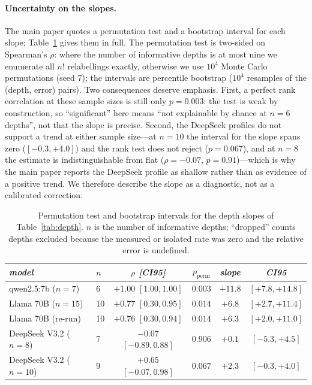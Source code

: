 \documentclass[sigconf,anonymous]{aamas}
\begin{document}
\paragraph{Uncertainty on the slopes.} The main paper quotes a permutation test and a
bootstrap interval for each slope; Table~\ref{tab:depth-perm} gives them in full. The
permutation test is two-sided on Spearman's $\rho$: where the number of informative
depths is at most nine we enumerate all $n!$ relabellings exactly, otherwise we use
$10^4$ Monte Carlo permutations (seed 7); the intervals are percentile bootstrap
($10^4$ resamples of the (depth, error) pairs). Two consequences deserve emphasis.
First, a perfect rank correlation at these sample sizes is still only
$p = 0.003$: the test is weak by construction, so ``significant'' here means ``not
explainable by chance at $n = 6$ depths'', not that the slope is precise. Second, the
DeepSeek profiles do not support a trend at either sample size---at $n = 10$ the
interval for the slope spans zero ($[-0.3, +4.0]$) and the rank test does not reject
($p = 0.067$), and at $n = 8$ the estimate is indistinguishable from flat
($\rho = -0.07$, $p = 0.91$)---which is why the main paper reports the DeepSeek profile
as shallow rather than as evidence of a positive trend. We therefore describe the
slope as a diagnostic, not as a calibrated correction.

\begin{table}[h]
\scriptsize
\centering
\caption{Permutation test and bootstrap intervals for the depth slopes of
Table~\ref{tab:depth}. $n$ is the number of informative depths; ``dropped'' counts
depths excluded because the measured or isolated rate was zero and the relative error
is undefined.}
\vspace{4pt}
\label{tab:depth-perm}
\setlength{\tabcolsep}{3pt}
\begin{tabular}{llcccc}
\toprule
\textit{model} & \textit{$n$} & \textit{$\rho$ [CI95]} & \textit{$p_{\mathrm{perm}}$}
& \textit{slope} & \textit{CI95} \\
\midrule
qwen2.5:7b ($n{=}7$)    & 6 & $+1.00$ $[1.00, 1.00]$ & $0.003$ & $+11.8$ & $[+7.8, +14.8]$ \\
Llama 70B ($n{=}15$)    & 10 & $+0.77$ $[0.30, 0.95]$ & $0.014$ & $+6.8$ & $[+2.7, +11.4]$ \\
Llama 70B (re-run)      & 10 & $+0.76$ $[0.30, 0.94]$ & $0.014$ & $+6.3$ & $[+2.0, +11.0]$ \\
DeepSeek V3.2 ($n{=}8$) & 7 & $-0.07$ $[-0.89, 0.88]$ & $0.906$ & $+0.1$ & $[-5.3, +4.5]$ \\
DeepSeek V3.2 ($n{=}10$) & 9 & $+0.65$ $[-0.07, 0.98]$ & $0.067$ & $+2.3$ & $[-0.3, +4.0]$ \\
\bottomrule
\end{tabular}
\end{table}
\end{document}
